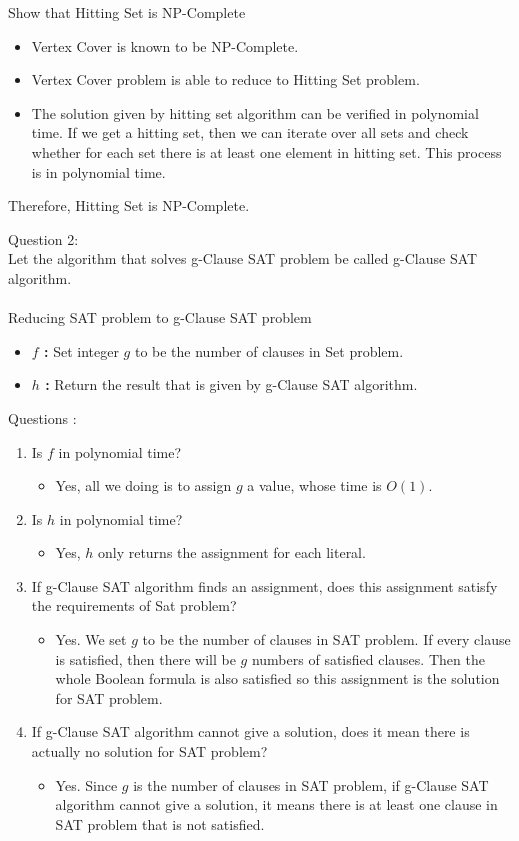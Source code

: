 \documentclass[12pt]{article}
\begin{document}
\noindent
Show that Hitting Set is NP-Complete
\begin{itemize}
  \item Vertex Cover is known to be NP-Complete.
  \item	Vertex Cover problem is able to reduce to Hitting Set problem.
  \item The solution given by hitting set algorithm can be verified in polynomial time. 
	If we get a hitting set, then we can iterate over all sets and check whether for each set there is at least one element in hitting set. 
	This process is in polynomial time.  
\end{itemize}
\noindent
Therefore, Hitting Set is NP-Complete.


\pagebreak
\noindent
\large Question 2: \vspace{5mm} \\
\normalsize
Let the algorithm that solves g-Clause SAT problem be called g-Clause SAT algorithm.
\\
\\
\noindent
Reducing SAT problem to g-Clause SAT problem
\begin{itemize}
  \item \textbf{$f$ :} Set integer $g$ to be the number of clauses in Set problem.  
  \item	\textbf{$h$ :} Return the result that is given by g-Clause SAT algorithm.
\end{itemize}

 Questions :
\begin{enumerate}
  \item Is \textbf{$f$} in polynomial time? 
	\begin{itemize}
	  \item Yes, all we doing is to assign $g$ a value, whose time is $O(1)$.
	\end{itemize}
  \item	Is \textbf{$h$} in polynomial time? 
	\begin{itemize}
	  \item Yes, $h$ only returns the assignment for each literal.  
	\end{itemize}
  \item If g-Clause SAT algorithm finds an assignment, does this assignment satisfy the requirements of Sat problem? 
	\begin{itemize}
	  \item Yes. We set $g$ to be the number of clauses in SAT problem. 
		If every clause is satisfied, then there will be $g$ numbers of satisfied clauses.
		Then the whole Boolean formula is also satisfied so this assignment is the solution for SAT problem.
	\end{itemize}
  \item If g-Clause SAT algorithm cannot give a solution, does it mean there is actually no solution for SAT problem? 
	\begin{itemize}
	  \item Yes. Since $g$ is the number of clauses in SAT problem, 
		if g-Clause SAT algorithm cannot give a solution, it means there is at least one clause in SAT problem that is not satisfied.
	\end{itemize}
\end{enumerate}
\end{document}
